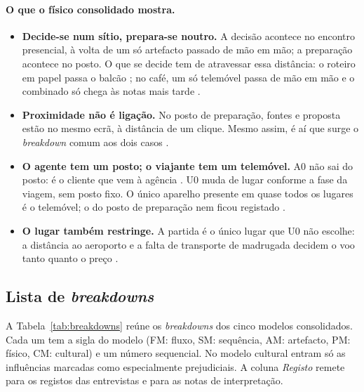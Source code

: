\paragraph{O que o físico consolidado mostra.}
\begin{itemize}
  \item \textbf{Decide-se num sítio, prepara-se noutro.} A decisão acontece no
        encontro presencial, à volta de um só artefacto passado de mão em mão;
        a preparação acontece no posto. O que se decide tem de atravessar essa
        distância: o roteiro em papel passa o balcão ; no café, um só
        telemóvel passa de mão em mão e o combinado só chega às notas mais
        tarde .
  \item \textbf{Proximidade não é ligação.} No posto de preparação, fontes e
        proposta estão no mesmo ecrã, à distância de um clique. Mesmo assim, é
        aí que surge o \textit{breakdown} comum aos dois casos .
  \item \textbf{O agente tem um posto; o viajante tem um telemóvel.} A0 não sai
        do posto: é o cliente que vem à agência . U0 muda de lugar
        conforme a fase da viagem, sem posto fixo. O único aparelho presente em
        quase todos os lugares é o telemóvel; o do posto de preparação nem ficou
        registado .
  \item \textbf{O lugar também restringe.} A partida é o único lugar que U0 não
        escolhe: a distância ao aeroporto e a falta de transporte de madrugada
        decidem o voo tanto quanto o preço .
\end{itemize}

\subsection{Lista de \textit{breakdowns}}\label{sec:breakdowns}

A Tabela~\ref{tab:breakdowns} reúne os \textit{breakdowns} dos cinco modelos consolidados. Cada um tem a sigla do modelo
(FM: fluxo, SM: sequência, AM: artefacto, PM: físico, CM: cultural) e um número sequencial. No modelo cultural entram só as
influências marcadas como especialmente prejudiciais. A coluna \textit{Registo} remete para os registos das entrevistas e para as
notas de interpretação.

